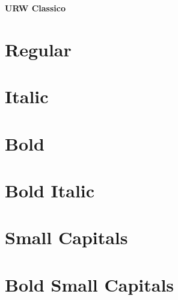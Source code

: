 \documentclass{article}
\begin{document}
\begin{center}\huge\bf URW Classico
\end{center}


\section*{Regular}
\lipsum[1]

\section*{Italic}
\textit{\lipsum[2]}

\section*{Bold}

\textbf{\lipsum[3]}

\section*{Bold Italic}

\textbf{\textit{\lipsum[4]}}

\section*{Small Capitals}

\textsc{\lipsum[1]}

\section*{Bold Small Capitals}

\textbf{\textsc{\lipsum[1]}}
\end{document}
